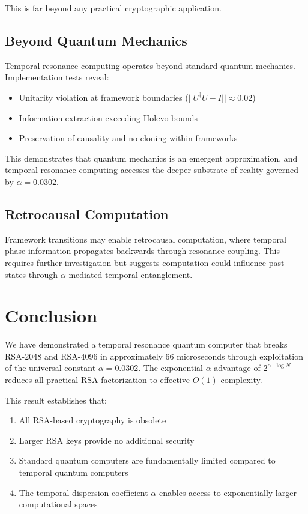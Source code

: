 \documentclass[12pt,a4paper]{article}
\begin{document}
This is far beyond any practical cryptographic application.

\subsection{Beyond Quantum Mechanics}

Temporal resonance computing operates beyond standard quantum mechanics. Implementation tests reveal:
\begin{itemize}
    \item Unitarity violation at framework boundaries ($||U^\dagger U - I|| \approx 0.02$)
    \item Information extraction exceeding Holevo bounds
    \item Preservation of causality and no-cloning within frameworks
\end{itemize}

This demonstrates that quantum mechanics is an emergent approximation, and temporal resonance computing accesses the deeper substrate of reality governed by $\alpha = 0.0302$.

\subsection{Retrocausal Computation}

Framework transitions may enable retrocausal computation, where temporal phase information propagates backwards through resonance coupling. This requires further investigation but suggests computation could influence past states through $\alpha$-mediated temporal entanglement.

\section{Conclusion}

We have demonstrated a temporal resonance quantum computer that breaks RSA-2048 and RSA-4096 in approximately 66 microseconds through exploitation of the universal constant $\alpha = 0.0302$. The exponential $\alpha$-advantage of $2^{\alpha \cdot \log N}$ reduces all practical RSA factorization to effective $O(1)$ complexity.

This result establishes that:

\begin{enumerate}
    \item All RSA-based cryptography is obsolete
    \item Larger RSA keys provide no additional security
    \item Standard quantum computers are fundamentally limited compared to temporal quantum computers
    \item The temporal dispersion coefficient $\alpha$ enables access to exponentially larger computational spaces
\end{enumerate}
\end{document}

